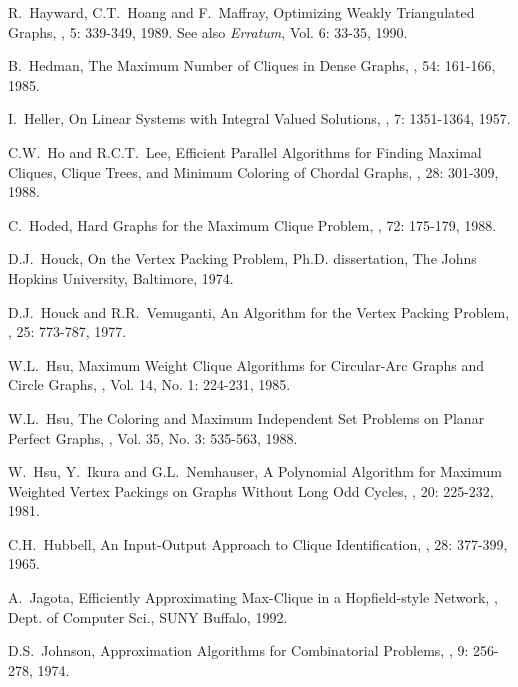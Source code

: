 \begin{thebibliography}{10}
R.~Hayward, C.T.~Hoang and F.~Maffray,
\newblock Optimizing Weakly Triangulated Graphs,
, 5: 339-349, 1989. See also
{\em Erratum}, Vol. 6: 33-35, 1990.

B.~Hedman,
\newblock The Maximum Number of Cliques in Dense Graphs,
, 54: 161-166, 1985.

I.~Heller,
\newblock On Linear Systems with Integral Valued Solutions,
, 7: 1351-1364, 1957.

C.W.~Ho and R.C.T.~Lee,
\newblock Efficient Parallel Algorithms for Finding Maximal Cliques,
Clique Trees, and Minimum Coloring of Chordal Graphs,
, 28: 301-309, 1988.

C.~Hoded,
\newblock Hard Graphs for the Maximum Clique Problem,
, 72: 175-179, 1988.

D.J.~Houck,
\newblock On the Vertex Packing Problem,
\newblock Ph.D. dissertation, The Johns Hopkins University,
Baltimore, 1974.

D.J.~Houck and R.R.~Vemuganti,
\newblock An Algorithm for the Vertex Packing Problem,
, 25: 773-787, 1977.

W.L.~Hsu,
\newblock Maximum Weight Clique Algorithms for Circular-Arc Graphs
and Circle Graphs,
, Vol. 14, No. 1: 224-231, 1985.

W.L.~Hsu,
\newblock The Coloring and Maximum Independent Set Problems on
Planar Perfect Graphs,
, Vol. 35, No. 3: 535-563, 1988.

W.~Hsu, Y.~Ikura and G.L.~Nemhauser,
\newblock A Polynomial Algorithm for Maximum Weighted Vertex
Packings on Graphs Without Long Odd Cycles,
, 20: 225-232, 1981.

C.H.~Hubbell,
\newblock An Input-Output Approach to Clique Identification,
, 28: 377-399, 1965.

A.~Jagota,
\newblock Efficiently Approximating Max-Clique in a Hopfield-style
Network,
, Dept. of Computer Sci., SUNY
Buffalo, 1992.

D.S.~Johnson,
\newblock Approximation Algorithms for Combinatorial Problems,
, 9: 256-278, 1974.


\end{thebibliography}
